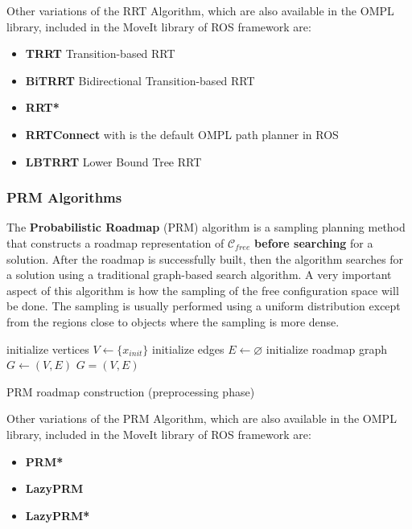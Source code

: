 Other variations of the RRT Algorithm, which are also available in the OMPL library, included in the MoveIt library of ROS framework  are:
\begin{itemize}
	\item \textbf{TRRT} Transition-based RRT
	\item \textbf{BiTRRT} Bidirectional Transition-based RRT
	\item \textbf{RRT*}
	\item \textbf{RRTConnect} with is the default OMPL path planner in ROS
	\item \textbf{LBTRRT} Lower Bound Tree RRT
\end{itemize}


\subsubsection{PRM Algorithms}

The \textbf{Probabilistic Roadmap} (PRM) algorithm is a sampling planning method that constructs a roadmap representation of $\mathcal{C}_{free}$ \textbf{before searching} for a solution. After the roadmap is successfully built, then the algorithm searches 
for a solution using a traditional graph-based search algorithm. A very important aspect of this algorithm is how the sampling of the free configuration space will be done. The sampling is usually performed using a 
uniform distribution except from the regions close to objects where the sampling is more dense.

\begin{algorithm}[H]
\SetAlgoLined
initialize vertices $V \leftarrow \lbrace x_{init} \rbrace$\;
initialize edges $E \leftarrow \varnothing$\;
initialize roadmap graph $G \leftarrow (V,E)$\;
\Return $G=(V,E)$
\caption{PRM roadmap construction (preprocessing phase)}
\end{algorithm}

Other variations of the PRM Algorithm, which are also available in the OMPL library, included in the MoveIt library of ROS framework  are:
\begin{itemize}
	\item \textbf{PRM*}
	\item \textbf{LazyPRM}
	\item \textbf{LazyPRM*}
\end{itemize}


